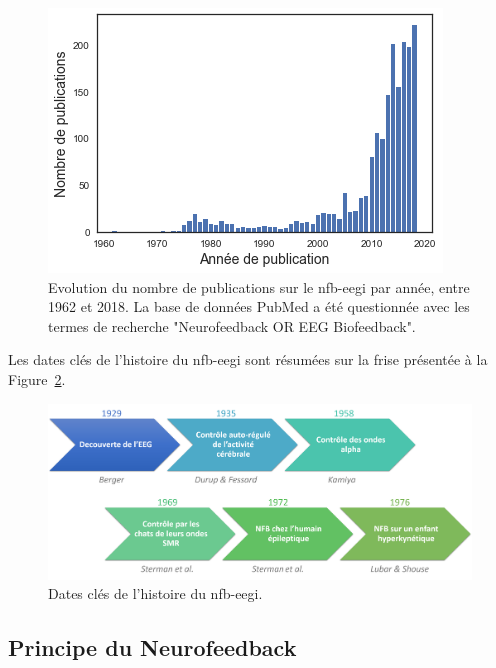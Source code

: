 \begin{figure}[h!]
  \centering
	\includegraphics[width=0.7\linewidth]{figures/chapter-1/introduction-number-of-nfb-publications} 
  \caption[Evolution du nombre de publications sur le  par année, entre 1962 et 2018.]{Evolution du nombre de publications sur le \gls{nfb}-\gls{eegi} par année, entre 1962 et 2018. La base de données PubMed a été questionnée avec les 
	termes de recherche "Neurofeedback OR EEG Biofeedback".}
  \label{Figure:introduction_number_of_nfb_publications}
\end{figure}

Les dates clés de l'histoire du \gls{nfb}-\gls{eegi} sont résumées sur la frise présentée à la Figure~\ref{Figure:introduction_nfb_history}.

\begin{figure}[h!]
  \centering
	\includegraphics[width=1\linewidth]{figures/chapter-1/introduction-nfb-history} 
  \caption[Dates clés de l'histoire du \gls{nfb}.]{Dates clés de l'histoire du \gls{nfb}-\gls{eegi}.}
  \label{Figure:introduction_nfb_history}
\end{figure}

\subsection{Principe du Neurofeedback} \label{principe_nfb}

